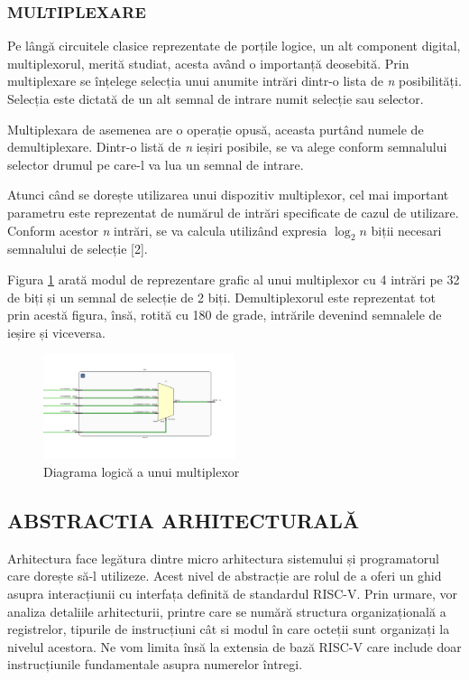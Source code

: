 \documentclass[12pt]{article}
\begin{document}
\subsubsection{MULTIPLEXARE}
Pe lângă circuitele clasice reprezentate de porțile logice, un alt component digital, multiplexorul, merită studiat, acesta având o importanță deosebită. Prin multiplexare se înțelege selecția unui anumite intrări dintr-o lista de \textit{n} posibilități. Selecția este dictată de un alt semnal de intrare numit selecție sau selector.

Multiplexara de asemenea are o operație opusă, aceasta purtând numele de demultiplexare. Dintr-o listă de \textit{n} ieșiri posibile, se va alege conform semnalului selector drumul pe care-l va lua un semnal de intrare.

Atunci când se dorește utilizarea unui dispozitiv multiplexor, cel mai important parametru este reprezentat de numărul de intrări specificate de cazul de utilizare. Conform acestor \textit{n} intrări, se va calcula utilizând expresia $\log_2{n}$ biții necesari semnalului de selecție [2].

Figura \ref{Figura:24} arată modul de reprezentare grafic al unui multiplexor cu 4 intrări pe 32 de biți și un semnal de selecție de 2 biți. Demultiplexorul este reprezentat tot prin acestă figura, însă, rotită cu 180 de grade, intrările devenind semnalele de ieșire și viceversa.
 \begin{figure}[h]
 \includegraphics[width=0.5\textwidth]{mux41.png}
 \centering
 \caption{Diagrama logică a unui multiplexor}
 \label{Figura:24}
 \end{figure}
 

\newpage
 \subsection{ABSTRACTIA ARHITECTURALĂ}
Arhitectura face legătura dintre micro arhitectura sistemului și programatorul care dorește să-l utilizeze. Acest nivel de abstracție are rolul de a oferi un ghid asupra interacțiunii cu interfața definită de standardul RISC-V. Prin urmare, vor analiza detaliile arhitecturii, printre care se numără structura organizațională a registrelor, tipurile de instrucțiuni cât si modul în care octeții sunt organizați la nivelul acestora. Ne vom limita însă la extensia de bază RISC-V care include doar instrucțiunile fundamentale asupra numerelor întregi.
\end{document}

